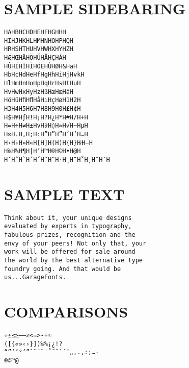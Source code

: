 \documentclass{article}
\begin{document}
\section{SAMPLE SIDEBARING}
\begin{verbatim}
HAHBHCHDHEHFHGHHH
HIHJHKHLHMHNHOHPHQH
HRHSHTHUHVHWHXHYHZH
HÆHŒHÄHÖHÜHÅHÇHÁH
HÛHÍHÏHÌHÓEHÙHØH&HaH
HbHcHdHeHfHgHhHiHjHvkH
HlHmHnHoHpHqHrHsHtHuH
HvHwHxHyHzHßHæHœHäH
HöHüHﬁHﬂHåHıHçHøH1H2H
H3H4H5H6H7H8H9H0H£H¢H
H$H¥HƒH!H¡H?H¿H*H#H/H+H
H=H÷H≠H±HvH∂H◊H≈H√H~HµH
H∞H.H,H;H:H”H”H”H‘H’H…H
H‹H›H»H«H[H]H(H)H{H}H⁄H–H
H‰H%H¶H|H’H™H®H©H•H@H
H˘HˆH`H´HˇH˜H¨H·H¸H¯H˚H˛H˝H˙H
\end{verbatim}
\section{SAMPLE TEXT}
\begin{verbatim}
Think about it, your unique designs
evaluated by experts in typography,
fabulous prizes, recognition and the
envy of your peers! Not only that, your
work will be offered for sale around
the world by the best alternative type
foundry going. And that would be
us...GarageFonts.
\end{verbatim}
\section{COMPARISONS}
\begin{verbatim}
÷±≤≥–—≠<=>-+≈
([{«»‹›}])‰%¡¿!?
“”‘’°’”ˆ˜¯˘˙˚˝ˇ`´¨„‚.,:;…·
®©™@
\end{verbatim}
\end{document}
